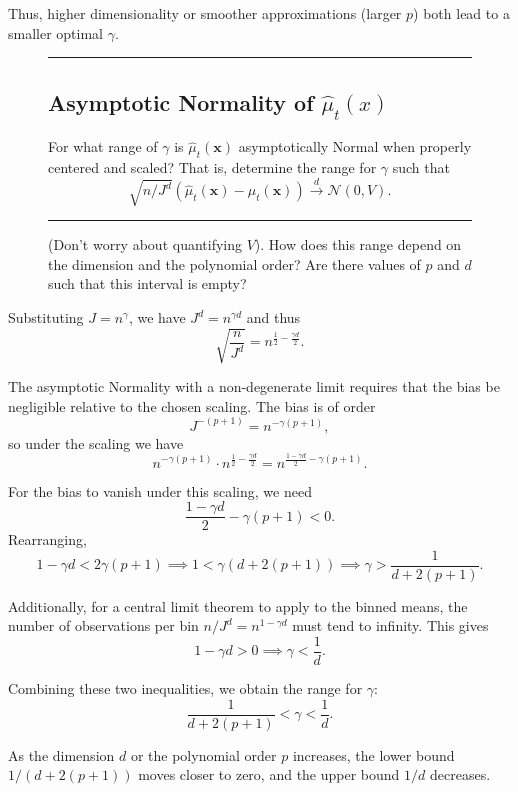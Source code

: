 \documentclass{article}
\newenvironment{colorparagraph}[1]{\par\color{#1}}{\par}
\begin{document}
Thus, higher dimensionality or smoother approximations (larger \( p \)) both lead to a smaller optimal \(\gamma\).
  
\begin{figure}[H]
  \begin{colorparagraph}{questioncolor}
  \rule{\textwidth}{0.5pt}
  \label{q1e}
  \subsection{Asymptotic Normality of \(\hat{\mu}_t(x)\)}
  
  For what range of \( \gamma \) is \( \hat{\mu}_t(\mathbf{x}) \) asymptotically Normal when properly centered and scaled? That is, determine the range for \( \gamma \) such that
  \[
  \sqrt{n / J^d} (\hat{\mu}_t(\mathbf{x}) - \mu_t(\mathbf{x})) \overset{d}{\to} \mathcal{N}(0, V).
  \]
  
  \rule{\textwidth}{0.5pt}

  (Don't worry about quantifying $V$). How does this range depend on the dimension and the polynomial order? Are there values of $p$ and $d$ such that this interval is empty?
  \end{colorparagraph}
\end{figure}

Substituting \( J = n^\gamma \), we have \( J^d = n^{\gamma d} \) and thus
\[
\sqrt{\frac{n}{J^d}} = n^{\frac{1}{2}-\frac{\gamma d}{2}}.
\]

The asymptotic Normality with a non-degenerate limit requires that the bias be negligible relative to the chosen scaling. The bias is of order
\[
J^{-(p+1)} = n^{-\gamma(p+1)},
\]
so under the scaling we have
\[
n^{-\gamma(p+1)} \cdot n^{\frac{1}{2}-\frac{\gamma d}{2}} = n^{\frac{1-\gamma d}{2} - \gamma(p+1)}.
\]

For the bias to vanish under this scaling, we need
\[
\frac{1-\gamma d}{2} - \gamma(p+1) < 0.
\]
Rearranging,
\[
1 - \gamma d < 2\gamma (p+1) \implies 1 < \gamma(d+2(p+1)) \implies \gamma > \frac{1}{d+2(p+1)}.
\]

Additionally, for a central limit theorem to apply to the binned means, the number of observations per bin \( n/J^d = n^{1-\gamma d} \) must tend to infinity. This gives
\[
1-\gamma d > 0 \implies \gamma < \frac{1}{d}.
\]

Combining these two inequalities, we obtain the range for \(\gamma\):
\[
\frac{1}{d+2(p+1)} < \gamma < \frac{1}{d}.
\]

As the dimension \( d \) or the polynomial order \( p \) increases, the lower bound \( 1/(d+2(p+1)) \) moves closer to zero, and the upper bound \( 1/d \) decreases.
\end{document}
